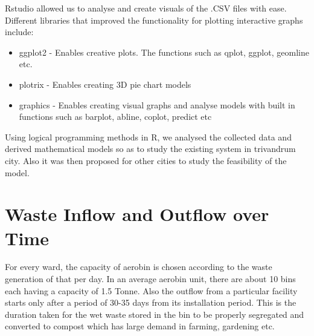 \documentclass[12pt,a4paper]{  report}
\begin{document}
Rstudio allowed us to analyse and create visuals of the .CSV files with ease. Different libraries that improved the functionality for plotting interactive graphs include: 

\begin{itemize}
\item ggplot2 - Enables creative plots. The functions such as qplot, ggplot, geomline etc.
\item plotrix - Enables creating 3D pie chart models
\item graphics - Enables creating visual graphs and analyse models with built in functions such as barplot, abline, coplot, predict etc
\end{itemize}

Using logical programming methods in R, we analysed the collected data and derived mathematical models so as to study the existing system in trivandrum city. Also it was then proposed for other cities to study the feasibility of the model.
	
\section{Waste Inflow and Outflow over Time}
For every ward, the capacity of aerobin is chosen according to the waste generation of that per day. In an average aerobin unit, there are about 10 bins each having a capacity of 1.5 Tonne. Also the outflow from a particular facility starts only after a period of 30-35 days from its installation period. This is the duration taken for the wet waste stored in the bin to be properly segregated and converted to compost which has large demand in farming, gardening etc.
	
\end{document}
